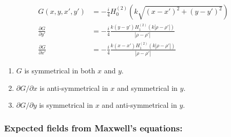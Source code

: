 \documentclass{article}
\newcommand{\0}{\varnothing}
\begin{document}
\begin{minipage}{0.45\textwidth}
\begin{align*}
    G(x, y, x', y') &= -\frac{i}{4}H_0^{(2)}(k\sqrt{(x-x')^2+(y-y')^2})\\
    \frac{\partial G}{\partial y'} &= -\frac{i}{4}\frac{k(y-y')H_1^{(2)}(k|\rho-\rho'|)}{|\rho-\rho'|}\\
    \frac{\partial G}{\partial x'} &= -\frac{i}{4}\frac{k(x-x')H_1^{(2)}(k|\rho-\rho'|)}{|\rho-\rho'|}
\end{align*}
\begin{enumerate}
    \item $G$ is symmetrical in both $x$ and $y$.
    \item $\partial G/ \partial x$ is anti-symmetrical in  $x$ and symmetrical in $y$.
    \item $\partial G/ \partial y$ is symmetrical in $x$ and anti-symmetrical in $y$.
\end{enumerate}
\end{minipage}
\newpage

\subsubsection*{Expected fields from Maxwell's equations:}

\end{document}
